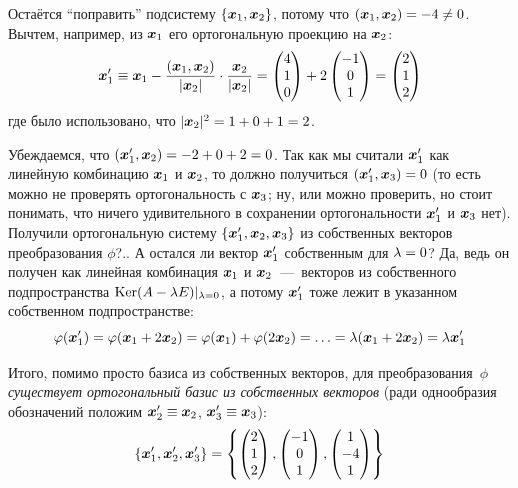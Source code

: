 \documentclass[a4paper,12pt]{article}
\theoremstyle{remark}
\begin{document}
\begin{solution}
  Остаётся ``поправить'' подсистему $\{\boldsymbol x_1, \boldsymbol x_2\}$, потому что $(\bds x_1, \bds x_2) \hm= -4 \hm{\not=} 0$.
  Вычтем, например, из $\boldsymbol x_1$ его ортогональную проекцию на $\boldsymbol x_2$:
  \[
    \boldsymbol x_1' \equiv \boldsymbol x_1 - \frac{(\boldsymbol x_1, \boldsymbol x_2)}{|\boldsymbol x_2|} \cdot \frac{\boldsymbol x_2}{|\boldsymbol x_2|}
    = \begin{pmatrix}4 \\ 1 \\ 0\end{pmatrix} + 2 \begin{pmatrix}-1 \\ 0 \\ 1\end{pmatrix}
    = \begin{pmatrix}2 \\ 1 \\ 2\end{pmatrix}
  \]
  где было использовано, что $|\bds x_2|^2 \hm= 1 \hm+ 0 \hm+ 1 \hm= 2$.
  
  Убеждаемся, что $(\bds x_1', \bds x_2) \hm= -2 \hm+ 0 \hm+ 2 \hm= 0$.
  Так как мы считали $\boldsymbol x_1'$ как линейную комбинацию $\boldsymbol x_1$ и $\boldsymbol x_2$, то должно получиться $(\bds x_1', \bds x_3) \hm= 0$ (то есть можно не проверять ортогональность с $\boldsymbol x_3$; ну, или можно проверить, но стоит понимать, что ничего удивительного в сохранении ортогональности $\boldsymbol x_1'$ и $\boldsymbol x_3$ нет).
  Получили ортогональную систему $\{\boldsymbol x_1', \boldsymbol x_2, \boldsymbol x_3\}$ из собственных векторов преобразования $\phi$?..
  А остался ли вектор $\boldsymbol x_1'$ собственным для $\lambda \hm= 0$?
  Да, ведь он получен как линейная комбинация $\boldsymbol x_1$ и $\boldsymbol x_2$~---~векторов из собственного подпространства $\Ker(A \hm- \lambda E)|_{\lambda = 0}$, а потому $\boldsymbol x_1'$ тоже лежит в указанном собственном подпространстве:
  \[
    \varphi(\boldsymbol x_1') = \varphi(\boldsymbol x_1 + 2 \boldsymbol x_2) = \varphi(\boldsymbol x_1) + \varphi(2 \boldsymbol x_2) = \ldots = \lambda (\boldsymbol x_1 + 2 \boldsymbol x_2) = \lambda \boldsymbol x_1'
  \]
  
  Итого, помимо просто базиса из собственных векторов, для преобразования~$\phi$ \emph{существует ортогональный базис из собственных векторов} (ради однообразия обозначений положим $\bds x_2' \hm\equiv \bds x_2$, $\bds x_3' \hm\equiv \bds x_3$):
  \begin{equation}\label{p29-19:orto-basis}
    \{\boldsymbol x_1', \boldsymbol x_2', \boldsymbol x_3'\} = \left\{
      \begin{pmatrix}
        2 \\ 1 \\ 2
      \end{pmatrix},
      \begin{pmatrix}
        -1 \\ 0 \\ 1
      \end{pmatrix},
      \begin{pmatrix}
        1 \\ -4 \\ 1
      \end{pmatrix}
    \right\}
  \end{equation}
  

\end{solution}
\end{document}
